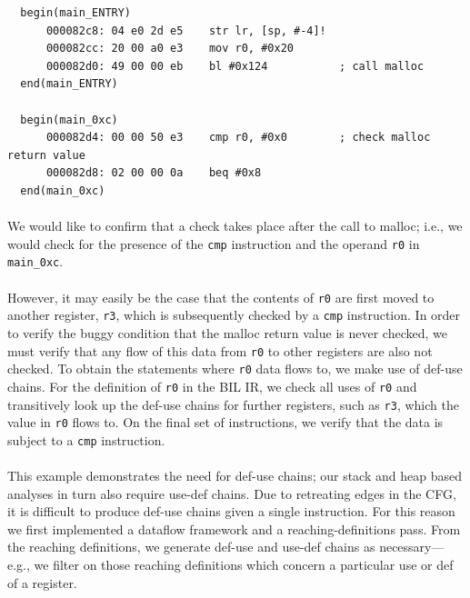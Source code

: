 \documentclass[letterpaper,11pt]{article}
\begin{document}
\begin{center}
\lstset{language=C, label=mallocdisasm,
caption=Malloc disassembly, breaklines=true, basicstyle=\tiny, numbers=none}
\begin{lstlisting}
  begin(main_ENTRY) 
      000082c8: 04 e0 2d e5    str lr, [sp, #-4]! 
      000082cc: 20 00 a0 e3    mov r0, #0x20       
      000082d0: 49 00 00 eb    bl #0x124           ; call malloc
  end(main_ENTRY)
 
  begin(main_0xc) 
      000082d4: 00 00 50 e3    cmp r0, #0x0        ; check malloc return value
      000082d8: 02 00 00 0a    beq #0x8            
  end(main_0xc)
\end{lstlisting}
\end{center}

\paragraph{}
We would like to confirm that a check takes place after the call to malloc;
i.e., we would check for the presence of the \texttt{cmp} instruction and the
operand \texttt{r0} in \texttt{main\_0xc}.

\paragraph{}
However, it may easily be the case that the contents of \texttt{r0} are first
moved to another register, \texttt{r3}, which is subsequently checked by a
\texttt{cmp} instruction. In order to verify the buggy condition that the malloc
return value is never checked, we must verify that any flow of this data from
\texttt{r0} to other registers are also not checked. To obtain the statements
where \texttt{r0} data flows to, we make use of def-use chains. For the
definition of \texttt{r0} in the BIL IR, we check all uses of \texttt{r0} and
transitively look up the def-use chains for further registers, such as
\texttt{r3}, which the value in \texttt{r0} flows to. On the final set of
instructions, we verify that the data is subject to a \texttt{cmp} instruction.

\paragraph{}
This example demonstrates the need for def-use chains; our stack and heap based
analyses in turn also require use-def chains. Due to retreating edges in the
CFG, it is difficult to produce def-use chains given a single instruction. For
this reason we first implemented a dataflow framework and a
reaching-definitions pass. From the reaching definitions, we generate def-use
and use-def chains as necessary---e.g., we filter on those reaching definitions
which concern a particular use or def of a register.
\end{document}
